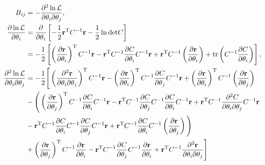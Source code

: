 \begin{align}
  B_{ij} &= -\frac{\partial^2 \ln{\mathcal{L}}}{\partial \theta_i \partial \theta_j}, \\
  \frac{\partial \ln{\mathcal{L}}}{\partial \theta_i} &= \frac{\partial}{\partial \theta_i} \left[
    -\frac{1}{2} \mathbf{r}^{\text{T}} C^{-1} \mathbf{r} -\frac{1}{2} \ln{\text{det}C} \right] \notag \\
  &= -\frac{1}{2} \left[ \left(\frac{\partial \mathbf{r}}{\partial \theta_i} \right)^{\text{T}} C^{-1} \mathbf{r}
    - \mathbf{r}^{\text{T}} C^{-1} \frac{\partial C}{\partial \theta_i} C^{-1} \mathbf{r} 
    + \mathbf{r}^{\text{T}} C^{-1} \left( \frac{\partial \mathbf{r}}{\partial \theta_i} \right)
    + \text{tr}\left( C^{-1} \frac{\partial C}{\partial \theta_i} \right) \right], \\
  \frac{\partial^2 \ln{\mathcal{L}}}{\partial \theta_i \partial \theta_j} &= -\frac{1}{2} \Bigg[ \Bigg.
    \left(\frac{\partial^2 \mathbf{r}}{\partial \theta_i \partial \theta_j} \right)^{\text{T}} C^{-1} \mathbf{r}
    - \left(\frac{\partial \mathbf{r}}{\partial \theta_i} \right)^{\text{T}} C^{-1} \frac{\partial C}{\partial \theta_j} C^{-1} \mathbf{r}
    + \left(\frac{\partial \mathbf{r}}{\partial \theta_i} \right)^{\text{T}} C^{-1} \left( \frac{\partial \mathbf{r}}{\partial \theta_j} \right) \notag \\
    &- \Bigg( \Bigg. \left(\frac{\partial \mathbf{r}}{\partial \theta_j} \right)^{\text{T}} C^{-1} \frac{\partial C}{\partial \theta_i} C^{-1} \mathbf{r} 
    - \mathbf{r}^{\text{T}} C^{-1} \frac{\partial C}{\partial \theta_j} C^{-1} \frac{\partial C}{\partial \theta_i} C^{-1} \mathbf{r}
    + \mathbf{r}^{\text{T}} C^{-1} \frac{\partial^2 C}{\partial \theta_i \partial \theta_j} C^{-1} \mathbf{r} \notag \\
    &- \mathbf{r}^{\text{T}} C^{-1} \frac{\partial C}{\partial \theta_i} C^{-1} \frac{\partial C}{\partial \theta_j} C^{-1} \mathbf{r}
    + \mathbf{r}^{\text{T}} C^{-1} \frac{\partial C}{\partial \theta_i} C^{-1} \left( \frac{\partial \mathbf{r}}{\partial \theta_j} \right) \Bigg. \Bigg) \notag \\
    &+ \left( \frac{\partial \mathbf{r}}{\partial \theta_j} \right)^{\text{T}} C^{-1} \frac{\partial \mathbf{r}}{\partial \theta_i}
    - \mathbf{r}^{\text{T}} C^{-1} \frac{\partial C}{\partial \theta_j} C^{-1} \frac{\partial \mathbf{r}}{\partial \theta_i}
    + \mathbf{r}^{\text{T}} C^{-1} \frac{\partial^2 \mathbf{r}}{\partial \theta_i \partial \theta_j} \Bigg. \Bigg] \label{appeq:2nd}
\end{align}

